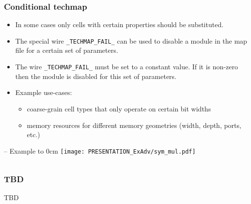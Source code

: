 \subsubsection{Conditional techmap}

\begin{frame}{\subsubsecname}
\begin{itemize}
\item In some cases only cells with certain properties should be substituted.
\medskip
\item The special wire {\tt \_TECHMAP\_FAIL\_} can be used to disable a module
in the map file for a certain set of parameters.
\medskip
\item The wire {\tt \_TECHMAP\_FAIL\_} must be set to a constant value. If it
is non-zero then the module is disabled for this set of parameters.
\medskip
\item Example use-cases:
\begin{itemize}
\item coarse-grain cell types that only operate on certain bit widths
\item memory resources for different memory geometries (width, depth, ports, etc.)
\end{itemize}
\end{itemize}
\end{frame}

\begin{frame}[t]{\subsubsecname{} -- Example}
\vbox to 0cm{
\vskip-0.5cm
\hfill\texttt{[image: PRESENTATION\_ExAdv/sym\_mul.pdf]}
\vss
}
\vskip-0.5cm

\begin{columns}
\column[t]{6cm}
\vskip-0.5cm
\column[t]{4cm}
\vskip-0.5cm
\end{columns}
\end{frame}

\subsubsection{TBD}

\begin{frame}{\subsubsecname}
TBD
\end{frame}

